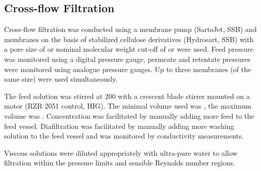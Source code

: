 \subsection{Cross-flow Filtration}
Cross-flow filtration was conducted using a membrane pump (SartoJet, SSB) and membranes on the basis of stabilized cellulose derivatives (Hydrosart, SSB) with a pore size of  or nominal molecular weight cut-off of  or  were used. Feed pressure was monitored using a digital pressure gauge, permeate and retentate pressures were monitored using analogue pressure gauges. Up to three membranes (of the same size) were used simultaneously.

The feed solution was stirred at \SI{200}{\rpm} with a crescent blade stirrer mounted on a motor (RZR 2051 control, HIG). The minimal volume used was , the maximum volume was . Concentration was facilitated by manually adding more feed to the feed vessel. Diafiltration was facilitated by manually adding more washing solution to the feed vessel and was monitored by conductivity measurements.

Viscous \eps{} solutions were diluted appropriately with ultra-pure water to allow filtration within the pressure limits and sensible Reynolds number regions.

